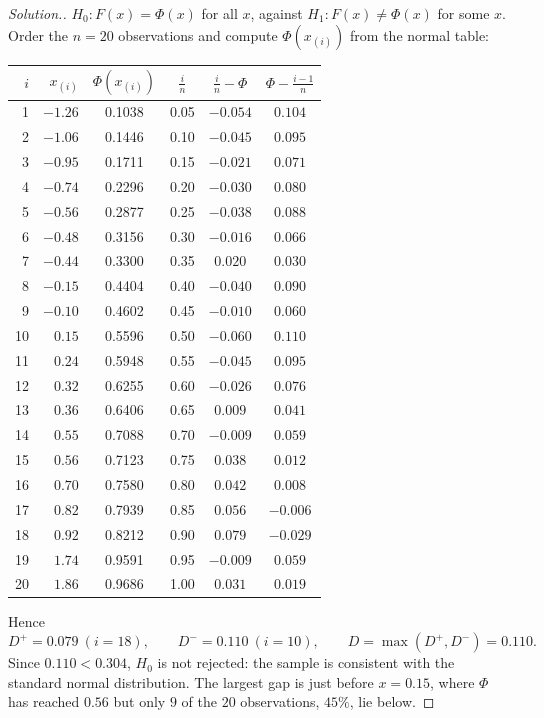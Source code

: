 \documentclass[11pt,a4paper]{article}
\theoremstyle{definition}
\newenvironment{solution}
  {\renewcommand{\qedsymbol}{}\begin{proof}[\textit{Solution}.]}
  {\end{proof}}
\begin{document}
\begin{solution}
$H_0: F(x) = \Phi(x)$ for all $x$, against $H_1: F(x)\neq\Phi(x)$ for some $x$. Order the
$n = 20$ observations and compute $\Phi\left(x_{(i)}\right)$ from the normal table:
\begin{center}
\begin{tabular}{rrcccc}
$i$ & $x_{(i)}$ & $\Phi\left(x_{(i)}\right)$ & $\frac{i}{n}$ & $\frac{i}{n}-\Phi$ & $\Phi-\frac{i-1}{n}$\\\hline
1 & $-1.26$ & 0.1038 & 0.05 & $-0.054$ & $0.104$\\
2 & $-1.06$ & 0.1446 & 0.10 & $-0.045$ & $0.095$\\
3 & $-0.95$ & 0.1711 & 0.15 & $-0.021$ & $0.071$\\
4 & $-0.74$ & 0.2296 & 0.20 & $-0.030$ & $0.080$\\
5 & $-0.56$ & 0.2877 & 0.25 & $-0.038$ & $0.088$\\
6 & $-0.48$ & 0.3156 & 0.30 & $-0.016$ & $0.066$\\
7 & $-0.44$ & 0.3300 & 0.35 & $0.020$ & $0.030$\\
8 & $-0.15$ & 0.4404 & 0.40 & $-0.040$ & $0.090$\\
9 & $-0.10$ & 0.4602 & 0.45 & $-0.010$ & $0.060$\\
10 & $0.15$ & 0.5596 & 0.50 & $-0.060$ & $\mathbf{0.110}$\\
11 & $0.24$ & 0.5948 & 0.55 & $-0.045$ & $0.095$\\
12 & $0.32$ & 0.6255 & 0.60 & $-0.026$ & $0.076$\\
13 & $0.36$ & 0.6406 & 0.65 & $0.009$ & $0.041$\\
14 & $0.55$ & 0.7088 & 0.70 & $-0.009$ & $0.059$\\
15 & $0.56$ & 0.7123 & 0.75 & $0.038$ & $0.012$\\
16 & $0.70$ & 0.7580 & 0.80 & $0.042$ & $0.008$\\
17 & $0.82$ & 0.7939 & 0.85 & $0.056$ & $-0.006$\\
18 & $0.92$ & 0.8212 & 0.90 & $\mathbf{0.079}$ & $-0.029$\\
19 & $1.74$ & 0.9591 & 0.95 & $-0.009$ & $0.059$\\
20 & $1.86$ & 0.9686 & 1.00 & $0.031$ & $0.019$
\end{tabular}
\end{center}
Hence
\[D^{+} = 0.079\ (i = 18),\qquad D^{-} = 0.110\ (i = 10),\qquad D = \max(D^{+},D^{-}) = 0.110.\]
Since $0.110 < 0.304$, $H_0$ is not rejected: the sample is consistent with the standard
normal distribution. The largest gap is just before $x = 0.15$, where $\Phi$ has reached
$0.56$ but only $9$ of the $20$ observations, $45\%$, lie below.


\end{solution}
\end{document}
